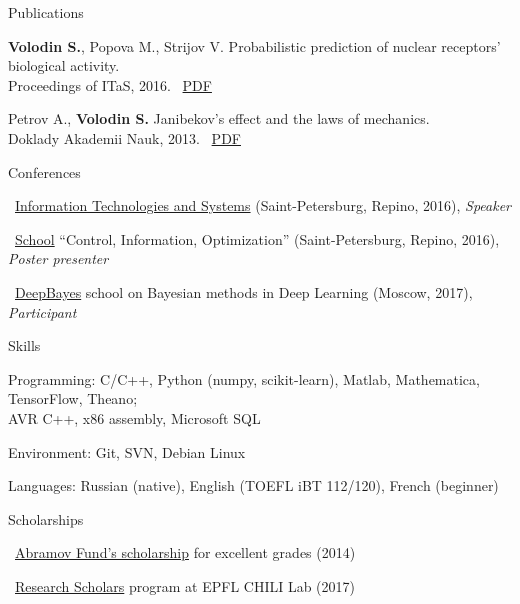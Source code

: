 \documentclass{resume} %
\begin{document}
\begin{rSection}{Publications}
\item {\bf Volodin S.}, Popova M., Strijov V. Probabilistic prediction of nuclear receptors’ biological activity.\\ Proceedings of ITaS, 2016. \faExternalLink~\href{http://itas2016.iitp.ru/pdf/1570303389.pdf}{PDF}
\item Petrov A., {\bf Volodin S.} Janibekov’s effect and the laws of mechanics.\\ Doklady Akademii Nauk, 2013. \faExternalLink~\href{https://link.springer.com/article/10.1134/S1028335813080041}{PDF}
\end{rSection}

\begin{rSection}{Conferences}
\item \faExternalLink~\href{http://iitp.ru/en/conferences/itas}{Information Technologies and Systems} (Saint-Petersburg, Repino, 2016){, \em Speaker}
\item \faExternalLink~\href{https://sites.google.com/site/traditionalschool/about}{School} ``Control, Information, Optimization'' (Saint-Petersburg, Repino, 2016){, \em Poster presenter}
\item \faExternalLink~\href{http://deepbayes.ru}{DeepBayes} school on Bayesian methods in Deep Learning (Moscow, 2017){, \em Participant}
\end{rSection}

\begin{rSection}{Skills}
	\item Programming: C/C++, Python (numpy, scikit-learn), Matlab, Mathematica, TensorFlow, Theano; \\AVR C++, x86 assembly, Microsoft SQL
	\item Environment: Git, SVN, Debian Linux
	\item Languages: Russian (native), English (TOEFL iBT 112/120), French (beginner)
\end{rSection}

\begin{rSection}{Scholarships}
\item \faExternalLink~\href{http://phystech-foundation.org/}{Abramov Fund's scholarship} for excellent grades (2014)
\item \faExternalLink~\href{https://ic.epfl.ch/ResearchScholars}{Research Scholars} program at EPFL CHILI Lab (2017)
\end{rSection}
\end{document}
